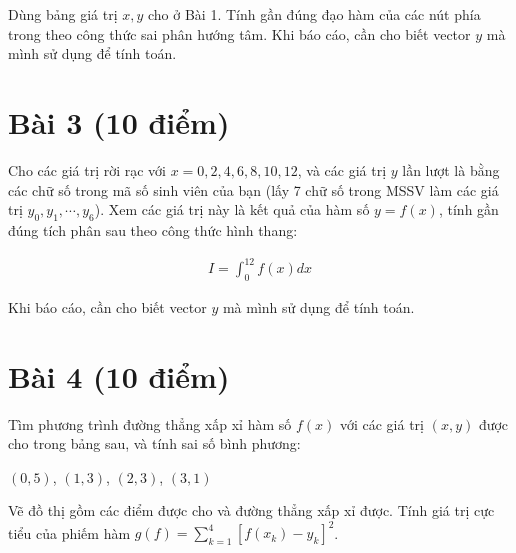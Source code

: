 \documentclass[12pt]{article}
\begin{document}
Dùng bảng giá trị $x,y$ cho ở Bài 1. Tính gần đúng đạo hàm của các nút phía trong theo công thức sai phân hướng tâm. Khi báo cáo, cần cho biết vector $y$ mà mình sử dụng để tính toán.

\section{Bài 3 (10 điểm)}

Cho các giá trị rời rạc với $x = 0,2,4,6,8,10,12$, và các giá trị $y$ lần lượt là bằng các chữ số trong mã số sinh viên của bạn (lấy 7 chữ số trong MSSV làm các giá trị $y_0, y_1, \cdots, y_6$). Xem các giá trị này là kết quả của hàm số $y=f(x)$, tính gần đúng tích phân sau theo công thức hình thang:

\begin{align*}
 I = \int_0^{12} f(x) dx
\end{align*}

Khi báo cáo, cần cho biết vector $y$ mà mình sử dụng để tính toán.

\section{Bài 4 (10 điểm)}

Tìm phương trình đường thẳng xấp xỉ hàm số $f(x)$ với các giá trị $(x,y)$ được cho trong bảng sau, và tính sai số bình phương:

$(0,5)$, $(1,3)$, $(2,3)$, $(3,1)$





Vẽ đồ thị gồm các điểm được cho và đường thẳng xấp xỉ được. Tính giá trị cực tiểu của phiếm hàm $g(f)=\sum_{k=1}^4 [f(x_k)-y_k]^2$.

% 
% 
\end{document}
